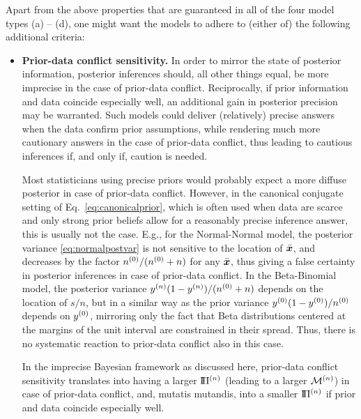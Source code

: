 Apart from the above properties that are guaranteed in all of the four model types (a) -- (d),
one might want the models to adhere to (either of) the following additional criteria:
\begin{itemize}
\item \textbf{Prior-data conflict sensitivity.}
In order to mirror the state of posterior information,
posterior inferences should, all other things equal, be more imprecise in the case of prior-data conflict.
Reciprocally, if prior information and data coincide especially well, an additional gain in posterior precision may be warranted.
Such models could deliver (relatively) precise answers when the data confirm prior assumptions,
while rendering much more cautionary answers in the case of prior-data conflict,
thus leading to cautious inferences if, and only if, caution is needed.

Most statisticians using precise priors would probably expect a more diffuse posterior in case of prior-data conflict.
However, in the canonical conjugate setting of Eq.~\eqref{eq:canonicalprior},
which is often used when data are scarce and only strong prior beliefs allow for a reasonably precise inference answer,
this is usually not the case.
E.g., for the Normal-Normal model, the posterior variance \eqref{eq:normalpostvar} is not sensitive to the location of $\bar{{\bm x}}$,
and decreases by the factor $n^{(0)}/(n^{(0)}+n)$ for any $\bar{{\bm x}}$,
thus giving a false certainty in posterior inferences in case of prior-data conflict.
In the Beta-Binomial model, the posterior variance $y^{(n)} (1-y^{(n)})/(n^{(0)} + n)$ depends on the location of $s/n$,
but in a similar way as the prior variance $y^{(0)} (1-y^{(0)})/n^{(0)}$ depends on $y^{(0)}$,
mirroring only the fact that Beta distributions centered at the margins of the unit interval are constrained in their spread.
Thus, there is no systematic reaction to prior-data conflict also in this case.

In the imprecise Bayesian framework as discussed here,
prior-data conflict sensitivity translates into having a larger $\text{I}\!\Pi^{(n)}$ (leading to a larger $\mathcal{M}^{(n)}$) in case of prior-data conflict,
and, mutatis mutandis, into a smaller $\text{I}\!\Pi^{(n)}$ if prior and data coincide especially well.


\end{itemize}
